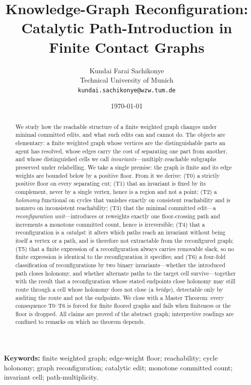 \documentclass[11pt,a4paper]{article}
\title{\textbf{Knowledge-Graph Reconfiguration:\\[2pt]
Catalytic Path-Introduction in Finite Contact Graphs}}
\author{%
Kundai Farai Sachikonye\\
\small Technical University of Munich\\
\small \texttt{kundai.sachikonye@wzw.tum.de}}
\date{\today}
\theoremstyle{thmstyle}
\theoremstyle{definition}
\theoremstyle{remark}
\begin{document}
\maketitle

\begin{abstract}
\noindent
We study how the reachable structure of a finite weighted graph changes
under minimal committed edits, and what such edits can and cannot do. The
objects are elementary: a finite weighted graph whose vertices are the
distinguishable parts an agent has resolved, whose edges carry the cost of
separating one part from another, and whose distinguished cells we call
\emph{invariants}---multiply-reachable subgraphs preserved under
relabelling. We take a single premise: the graph is finite and its edge
weights are bounded below by a positive floor. From it we derive: (T0) a
strictly positive floor on every separating cut; (T1) that an invariant is
fixed by its complement, never by a single vertex, hence is a region and
not a point; (T2) a \emph{holonomy} functional on cycles that vanishes
exactly on consistent reachability and is nonzero on inconsistent
reachability; (T3) that the minimal committed edit---a
\emph{reconfiguration unit}---introduces or reweights exactly one
floor-crossing path and increments a monotone committed count, hence is
irreversible; (T4) that a reconfiguration is a \emph{catalyst}: it alters
which paths reach an invariant without being itself a vertex or a path, and
is therefore not extractable from the reconfigured graph; (T5) that a
finite expression of a reconfiguration always carries removable slack, so
no finite expression is identical to the reconfiguration it specifies; and
(T6) a four-fold classification of reconfigurations by two binary
invariants---whether the introduced path closes holonomy, and whether
alternate paths to the target cell survive---together with the result that
a reconfiguration whose stated endpoints close holonomy may still route
through a cell whose holonomy does not close (a \emph{bridge}), detectable
only by auditing the route and not the endpoints. We close with a Master
Theorem: every consequence T0--T6 is forced for finite floored graphs and
fails when finiteness or the floor is dropped. All claims are proved of the
abstract graph; interpretive readings are confined to remarks on which no
theorem depends.
\end{abstract}

\noindent\textbf{Keywords:} finite weighted graph; edge-weight floor;
reachability; cycle holonomy; graph reconfiguration; catalytic edit;
monotone committed count; invariant cell; path-multiplicity.
\end{document}
